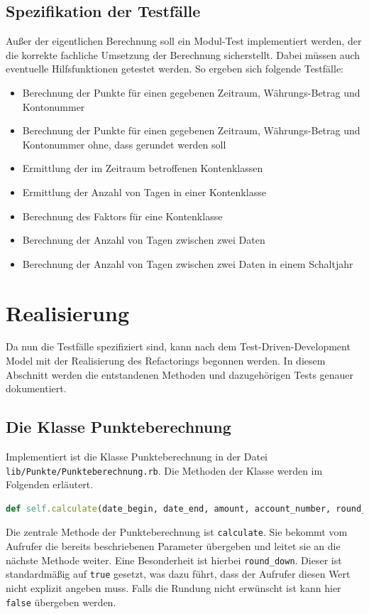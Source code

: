 \documentclass[12pt]{scrreprt}
\begin{document}
\subsection{Spezifikation der Testfälle}
Außer der eigentlichen Berechnung soll ein Modul-Test implementiert werden, der die korrekte fachliche Umsetzung der Berechnung sicherstellt. Dabei müssen auch eventuelle Hilfsfunktionen getestet werden. So ergeben sich folgende Testfälle:

\begin{itemize}
  \item Berechnung der Punkte für einen gegebenen Zeitraum, Währungs-Betrag und Kontonummer
  \item Berechnung der Punkte für einen gegebenen Zeitraum, Währungs-Betrag und Kontonummer ohne, dass gerundet werden soll
  \item Ermittlung der im Zeitraum betroffenen Kontenklassen
  \item Ermittlung der Anzahl von Tagen in einer Kontenklasse
  \item Berechnung des Faktors für eine Kontenklasse
  \item Berechnung der Anzahl von Tagen zwischen zwei Daten
  \item Berechnung der Anzahl von Tagen zwischen zwei Daten in einem Schaltjahr  
\end{itemize}

\section{Realisierung}

Da nun die Testfälle spezifiziert sind, kann nach dem Test-Driven-Development Model mit der Realisierung des Refactorings begonnen werden. In diesem Abschnitt werden die entstandenen Methoden und dazugehörigen Tests genauer dokumentiert.

\subsection{Die Klasse Punkteberechnung}

Implementiert ist die Klasse Punkteberechnung in der Datei \newline\verb+lib/Punkte/Punkteberechnung.rb+. Die Methoden der Klasse werden im Folgenden erläutert.\\

\begin{lstlisting}[language=Ruby]
def self.calculate(date_begin, date_end, amount, account_number, round_down = true)
\end{lstlisting}
Die zentrale Methode der Punkteberechnung ist \verb+calculate+. Sie bekommt vom Aufrufer die bereits beschriebenen Parameter übergeben und leitet sie an die nächste Methode weiter. Eine Besonderheit ist hierbei \verb+round_down+. Dieser ist standardmäßig auf \verb+true+ gesetzt, was dazu führt, dass der Aufrufer diesen Wert nicht explizit angeben muss. Falls die Rundung nicht erwünscht ist kann hier \verb+false+ übergeben werden. \\
\end{document}
